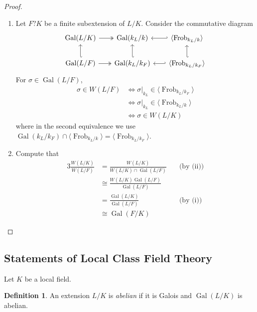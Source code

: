 \documentclass[11pt]{article}
\theoremstyle{definition}
\newtheorem{definition}{Definition}[subsection]
\theoremstyle{plain}
\theoremstyle{remark}
\DeclareMathOperator{\Gal}{Gal}
\DeclareMathOperator{\Frob}{Frob}
\begin{document}
\begin{proof}
\begin{enumerate}
        \item Let $F?K$ be a finite subextension of $L/K$. Consider the commutative diagram
            \begin{equation*}
                \begin{tikzcd}[column sep=scriptsize]
                \Gal(L/K) \arrow[r, twoheadrightarrow] \arrow[d, hookleftarrow] & \Gal(k_L/k) \arrow[r, hookleftarrow] \arrow[d, hookleftarrow] & \langle \Frob_{k_L/k} \arrow[d, hookleftarrow] \rangle\\
                \Gal(L/F) \arrow[r, twoheadrightarrow] & \Gal(k_L/k_F) \arrow[r, hookleftarrow] & \langle \Frob_{k_L/k_F} \rangle
            \end{tikzcd}
            \end{equation*}
            For $\sigma \in \Gal(L/F)$,
            \begin{align*}
                \sigma \in W(L/F)
                &\iff \sigma \vert_{k_L} \in \langle \Frob_{k_L/k_F} \rangle\\
                &\iff \sigma \vert_{k_L} \in \langle \Frob_{k_L/k} \rangle\\
                &\iff \sigma \in W(L/K)
            \end{align*}
            where in the second equivalence we use $\Gal(k_L/k_F) \cap \langle \Frob_{k_L/k} \rangle = \langle \Frob_{k_L/k_F} \rangle$.
        \item Compute that
            \begin{alignat*}{3}
                \frac{W(L/K)}{W(L/F)}
                &= \frac{W(L/K)}{W(L/K) \cap \Gal(L/F)} &\quad\text{(by (ii))}\\
                &\cong \frac{W(L/K) \Gal(L/F)}{\Gal(L/F)}\\
                &= \frac{\Gal(L/K)}{\Gal(L/F)} &\quad\text{(by (i))}\\
                &\cong \Gal(F/K)
            \end{alignat*}
            \qedhere
    \end{enumerate}
\end{proof}

\subsection{Statements of Local Class Field Theory}

Let $K$ be a local field.

\begin{definition}\label{def:17_1}
    An extension $L/K$ is \emph{abelian} if it is Galois and $\Gal(L/K)$ is abelian.
\end{definition}
\end{document}
